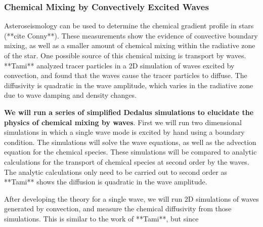 {\color{purple}
\subsubsection{Chemical Mixing by Convectively Excited Waves}
}

Asteroseismology can be used to determine the chemical gradient profile in stars (**cite Conny**). These measurements show the evidence of convective boundary mixing, as well as a smaller amount of chemical mixing within the radiative zone of the star. One possible source of this chemical mixing is transport by waves. **Tami** analyzed tracer particles in a 2D simulation of waves excited by convection, and found that the waves cause the tracer particles to diffuse. The diffusivity is quadratic in the wave amplitude, which varies in the radiative zone due to wave damping and density changes.

\textbf{We will run a series of simplified Dedalus simulations to elucidate the physics of chemical mixing by waves}. First we will run two dimensional simulations in which a single wave mode is excited by hand using a boundary condition. The simulations will solve the wave equations, as well as the advection equation for the chemical species. These simulations will be compared to analytic calculations for the transport of chemical species at second order by the waves. The analytic calculations only need to be carried out to second order as **Tami** shows the diffusion is quadratic in the wave amplitude.

After developing the theory for a single wave, we will run 2D simulations of waves generated by convection, and measure the chemical diffusivity from those simulations. This is similar to the work of **Tami**, but since 
